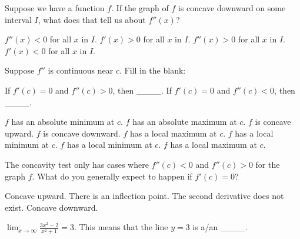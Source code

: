 \documentclass[addpoints, 12pt]{exam}%
\newcommand{\spc}{\vspace*{0.5cm}}
\begin{document}
\begin{questions}
\spc

\question[1]

Suppose we have a function $f$. If the graph of $f$ is concave downward on some interval $I$, what does that tell us about $f''(x)$?

\begin{multicols}{2}
\begin{choices}
\CorrectChoice $f''(x) < 0$ for all $x$ in $I$.
\choice $f'(x) > 0$ for all $x$ in $I$.
\choice $f''(x) > 0$ for all $x$ in $I$.
\choice $f'(x) < 0$ for all $x$ in $I$.
\end{choices}
\end{multicols}

\spc

\question[1]

Suppose $f''$ is continuous near $c$.
Fill in the blank:

If $f'(c) = 0$ and $f''(c) > 0$, then ____. If $f'(c) = 0$ and $f''(c) < 0$, then ____.

\begin{multicols}{2}
\begin{choices}
\choice $f$ has an absolute minimum at $c$.
\newline $f$ has an absolute maximum at $c$.
\choice $f$ is concave upward.
\newline $f$ is concave downward.
\choice $f$ has a local maximum at $c$.
\newline $f$ has a local minimum at $c$.
\CorrectChoice $f$ has a local minimum at $c$.
\newline $f$ has a local maximum at $c$.
\end{choices}
\end{multicols}

\spc

\question[1]

The concavity test only has cases where $f''(c) < 0$ and $f''(c) > 0$ for the graph $f$. What do you generally expect to happen if $f'(c) = 0$?

\begin{choices}
\choice Concave upward.
\CorrectChoice There is an inflection point.
\choice The second derivative does not exist.
\choice Concave downward.
\end{choices}

\spc

\question[1]

$\lim_{x \to \infty} \frac{3x^2 -2}{x^2 + 1} = 3$. This means that the line $y = 3$ is a/an ____.


\end{questions}
\end{document}
